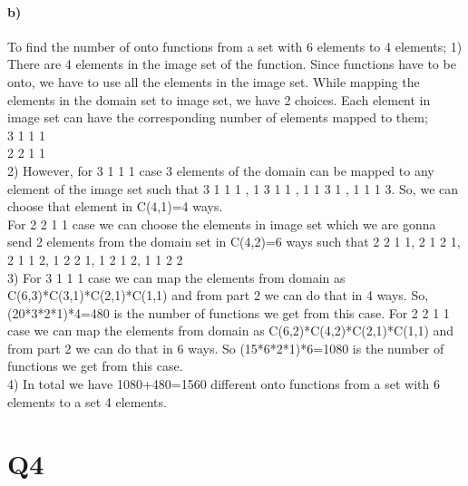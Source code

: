 \documentclass[11pt]{article}
\begin{document}
\paragraph{\textbf{b)}}
To find the number of onto functions from a set with 6 elements to 4 elements;
1) There are 4 elements in the image set of the function. Since functions have to be onto, we have to use all the elements in the image set. While mapping the elements in the domain set to image set, we have 2 choices. Each element in image set can have the corresponding number of elements mapped to them;\\
3 1 1 1\\
2 2 1 1\\
2) However, for  3 1 1 1 case 3 elements of the domain can be mapped to any element of the image set such that  3 1 1 1 , 1 3 1 1 ,  1 1 3 1 , 1 1 1 3. So, we can choose that element in C(4,1)=4 ways.\\
For  2 2 1 1 case we can choose the elements in image set which we are gonna send 2 elements from the domain set in C(4,2)=6 ways such that  2 2 1 1, 2 1 2 1, 2 1 1 2, 1 2 2 1, 1 2 1 2, 1 1 2 2 \\
3) For  3 1 1 1 case we can map the elements from domain as C(6,3)*C(3,1)*C(2,1)*C(1,1) and from part 2 we can do that in 4 ways. So, (20*3*2*1)*4=480 is the number of functions we get from this case.
For 2 2 1 1 case we can map the elements from domain as C(6,2)*C(4,2)*C(2,1)*C(1,1) and from part 2 we can do that in 6 ways. So (15*6*2*1)*6=1080 is the number of functions we get from this case. \\
4) In total we have 1080+480=1560 different onto functions from a set with 6 elements to a set 4 elements. 
\section*{Q4}
\end{document}
